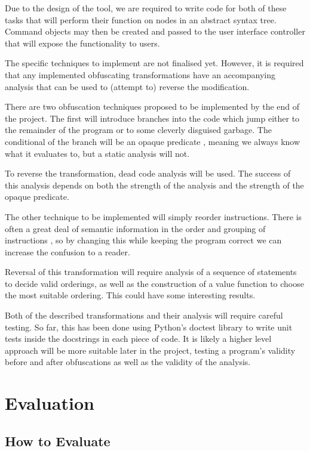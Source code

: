 \documentclass{report}
\begin{document}
Due to the design of the tool, we are required to write code for both of these tasks
that will perform their function on nodes in an abstract syntax tree. Command objects may then be
created and passed to the user interface controller that will expose the functionality
to users.

The specific techniques to implement are not finalised yet. However, it is required that
any implemented obfuscating transformations have an accompanying analysis that can be
used to (attempt to) reverse the modification.

There are two obfuscation techniques proposed to be implemented by the end of the project.
The first will introduce branches into the code which jump either to the remainder of the program
or to some cleverly disguised garbage. The conditional of the branch will be an opaque predicate
\cite{taxobftrans}, meaning we always know what it evaluates to, but a static analysis will not.

To reverse the transformation, dead code analysis will be used. The success of this analysis
depends on both the strength of the analysis and the strength of the opaque predicate.

The other technique to be implemented will simply reorder instructions. There is often a
great deal of semantic information in the order and grouping of instructions
\cite{taxobftrans}, so by changing this while keeping the program correct we can increase
the confusion to a reader.

Reversal of this transformation will require analysis of a sequence of statements to decide
valid orderings, as well as the construction of a value function to choose the most suitable
ordering. This could have some interesting results.

Both of the described transformations and their analysis will require careful testing. So far,
this has been done using Python's doctest library to write unit tests inside the docstrings
in each piece of code. It is likely a higher level approach will be more suitable later in
the project, testing a program's validity before and after obfuscations as well as the validity
of the analysis.

\section{Evaluation}

\subsection{How to Evaluate}
\end{document}
